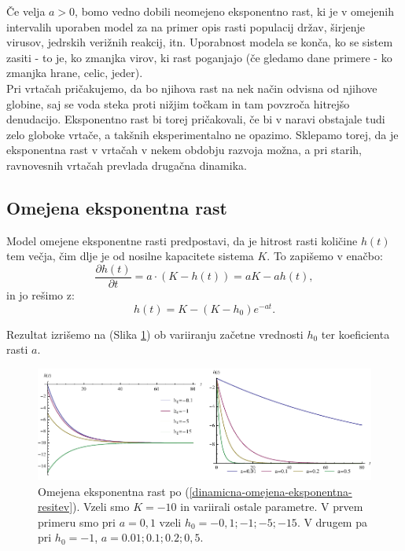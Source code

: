 \documentclass[a4paper, twoside, 12pt]{book}
\begin{document}
Če velja $a > 0$, bomo vedno dobili neomejeno eksponentno rast, ki je v omejenih intervalih uporaben model za na primer opis rasti populacij držav, širjenje virusov, jedrskih verižnih reakcij, itn. Uporabnost modela se konča, ko se sistem zasiti - to je, ko zmanjka virov, ki rast poganjajo (če gledamo dane primere - ko zmanjka hrane, celic, jeder).\\
Pri vrtačah pričakujemo, da bo njihova rast na nek način odvisna od njihove globine, saj se voda steka proti nižjim točkam in tam povzroča hitrejšo denudacijo. Eksponentno rast bi torej pričakovali, če bi v naravi obstajale tudi zelo globoke vrtače, a takšnih eksperimentalno ne opazimo. Sklepamo torej, da je eksponentna rast v vrtačah v nekem obdobju razvoja možna, a pri starih, ravnovesnih vrtačah prevlada drugačna dinamika.


\subsection{Omejena eksponentna rast}

Model omejene eksponentne rasti predpostavi, da je hitrost rasti količine $h(t)$ tem večja, čim dlje je od nosilne kapacitete sistema $K$. To zapišemo v enačbo:
    \begin{equation}
      \frac{\partial h(t)}{\partial t} = a \cdot ( K - h(t) ) = a K - a h(t),
      \label{dinamicna-omejena-eksponentna}
    \end{equation}
in jo rešimo z:
   \begin{equation}
      h(t) = K - (K - h_0) e^{-a t}.
      \label{dinamicna-omejena-eksponentna-resitev}
    \end{equation}

Rezultat izrišemo na (Slika \ref{fig:omejena-eksponentna-rast}) ob variiranju začetne vrednosti $h_0$ ter koeficienta rasti $a$.

    \begin{figure}[h]
      \begin{center}
        \includegraphics[width=14cm]{slike/omejena-eksponentna-rast}
      \end{center}
      \caption{Omejena eksponentna rast po (\ref{dinamicna-omejena-eksponentna-resitev}). Vzeli smo $K=-10$ in variirali ostale parametre. V prvem primeru smo pri $a=0,1$ vzeli $h_0=-0,1;-1;-5;-15$. V drugem pa pri $h_0=-1$, $a=0.01;0.1;0.2;0,5$.}
      \label{fig:omejena-eksponentna-rast}
    \end{figure}
\end{document}
